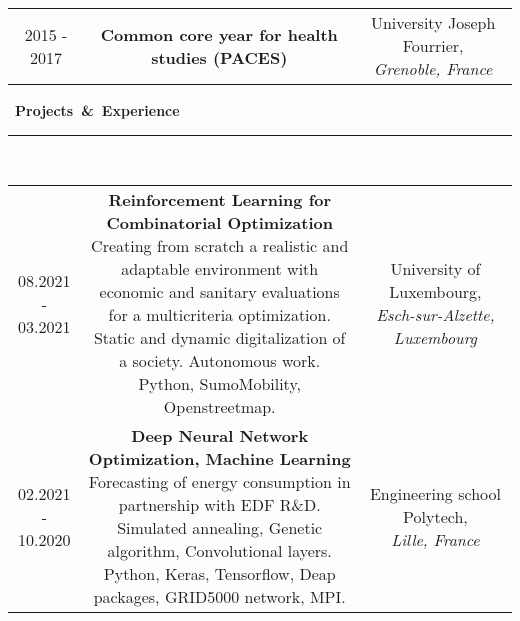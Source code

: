 \documentclass[a4paper]{article}
\begin{document}
\begin{titlepage}
\begin{tabular}{ccc}
\\

\parbox[]{0.11\linewidth}{2015 - 2017\\} 
&
\parbox[]{0.59\linewidth}{\large \textbf{Common core year for health studies (PACES)}\\}
&
\parbox[]{0.3\linewidth}{University Joseph Fourrier,\\ \textit{Grenoble, France}\\}
\end{tabular}

\medskip

\mbox{\Large \comfortaa \textbf{ \faHandshake \hspace{0.2cm} Projects \& Experience}}\\
\rule{0.8\linewidth}{0.01mm}\\[0.2cm]
\begin{tabular}{ccc}
\parbox[]{0.11\linewidth}{08.2021 -\\ 03.2021\\} 
&
\parbox[]{0.59\linewidth}{\textbf{\large Reinforcement Learning for Combinatorial Optimization}\\
Creating from scratch a realistic and adaptable environment with \\economic and sanitary evaluations for a multicriteria optimization.\\
Static and dynamic digitalization of a society. Autonomous work.\\
Python, SumoMobility, Openstreetmap.\\}
&
\parbox[]{0.3\linewidth}{University of Luxembourg,\\
\textit{Esch-sur-Alzette, Luxembourg}\\}

\\

\parbox[]{0.11\linewidth}{02.2021 -\\ 10.2020\\} 
&
\parbox[]{0.59\linewidth}{\textbf{\large Deep Neural Network Optimization, Machine Learning}\\
Forecasting of energy consumption in partnership with EDF R\&D.\\
Simulated annealing, Genetic algorithm, Convolutional layers.\\
Python, Keras, Tensorflow, Deap packages, GRID5000 network, MPI.\\}
&
\parbox[]{0.3\linewidth}{Engineering school Polytech,\\ \textit{Lille, France}\\}
\end{tabular}


\end{titlepage}
\end{document}

